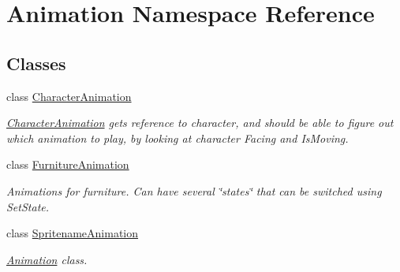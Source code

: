 \hypertarget{namespace_animation}{}\section{Animation Namespace Reference}
\label{namespace_animation}
\subsection*{Classes}
\begin{DoxyCompactItemize}
\item 
class \hyperlink{class_animation_1_1_character_animation}{Character\+Animation}
\begin{DoxyCompactList}\small\item\em \hyperlink{class_animation_1_1_character_animation}{Character\+Animation} gets reference to character, and should be able to figure out which animation to play, by looking at character Facing and Is\+Moving. \end{DoxyCompactList}\item 
class \hyperlink{class_animation_1_1_furniture_animation}{Furniture\+Animation}
\begin{DoxyCompactList}\small\item\em Animations for furniture. Can have several \char`\"{}states\char`\"{} that can be switched using Set\+State. \end{DoxyCompactList}\item 
class \hyperlink{class_animation_1_1_spritename_animation}{Spritename\+Animation}
\begin{DoxyCompactList}\small\item\em \hyperlink{namespace_animation}{Animation} class. \end{DoxyCompactList}\end{DoxyCompactItemize}
